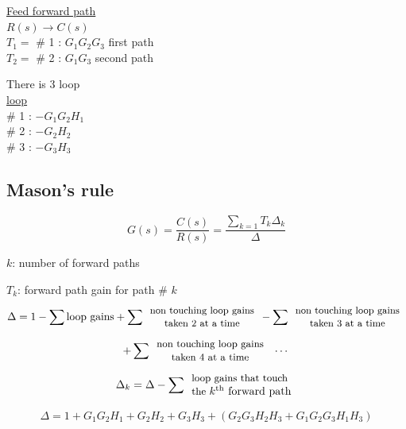 \documentclass[11pt,a4paper]{article}
\begin{document}
\noindent
\begin{minipage}[t]{0.48\linewidth}
\textcolor{kirmizikalem}{\underline{Feed forward path}}\\
$R(s) \rightarrow C(s)$\\[4pt]
\textcolor{turuncukalem}{$T_1 =$} \# 1 : $G_1G_2G_3$ \quad \textcolor{turuncukalem}{first path}\\[2pt]
\textcolor{turuncukalem}{$T_2 =$} \# 2 : $G_1G_3$ \quad \textcolor{turuncukalem}{second path}
\end{minipage}\hfill
\begin{minipage}[t]{0.48\linewidth}
There is 3 loop\\[4pt]
\textcolor{kirmizikalem}{\underline{loop}}\\
\# 1 : $-G_1G_2H_1$\\
\# 2 : $-G_2H_2$\\
\# 3 : $-G_3H_3$
\end{minipage}

\subsection{Mason's rule}
\[ G(s) = \frac{C(s)}{R(s)} = \frac{\sum_{k=1} T_k \Delta_k}{\Delta} \]


\noindent $k$: number of forward paths

\noindent $T_k$: forward path gain for path \# $k$
\[ \Delta = 1 - \sum \text{loop gains} + \sum \begin{array}{c}\text{\small non touching loop gains}\\ \text{\small taken 2 at a time}\end{array} - \sum \begin{array}{c}\text{\small non touching loop gains}\\ \text{\small taken 3 at a time}\end{array} \]
\[ + \sum \begin{array}{c}\text{\small non touching loop gains}\\ \text{\small taken 4 at a time}\end{array} \ \cdots \]
\[ \Delta_k = \Delta - \sum \begin{array}{l}\text{\small loop gains that touch}\\ \text{\small the } k^{\text{th}} \text{ forward path}\end{array} \]

\[ \Delta = 1 + G_1G_2H_1 + G_2H_2 + G_3H_3 + (G_2G_3H_2H_3 + G_1G_2G_3H_1H_3) \]
\end{document}
